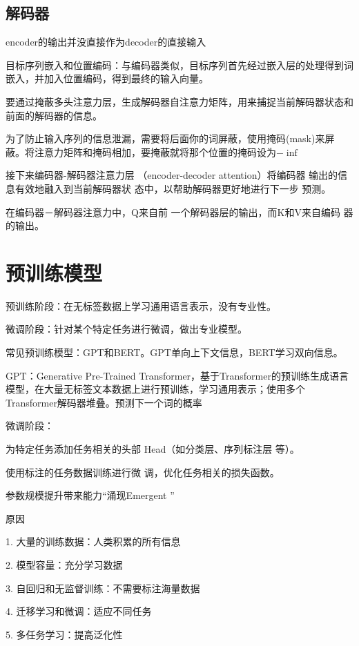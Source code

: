 \documentclass[UTF8]{ctexart}
\begin{document}
\subsection{解码器}
encoder的输出并没直接作为decoder的直接输⼊

目标序列嵌⼊和位置编码：与编码器类似，目标序列首先经过嵌⼊层的处理得到词嵌⼊，并加⼊位置编码，得到最终的输⼊向量。

要通过掩蔽多头注意力层，生成解码器自注意力矩阵，用来捕捉当前解码器状态和前面的解码器的信息。

为了防止输入序列的信息泄漏，需要将后面你的词屏蔽，使用掩码(mask)来屏蔽。将注意力矩阵和掩码相加，要掩蔽就将那个位置的掩码设为$-\inf$

接下来编码器-解码器注意⼒层
（encoder-decoder attention）将编码器
输出的信息有效地融⼊到当前解码器状
态中，以帮助解码器更好地进⾏下⼀步
预测。

在编码器－解码器注意⼒中，Q来自前
⼀个解码器层的输出，⽽K和V来自编码
器的输出。

\section{预训练模型}

预训练阶段：在无标签数据上学习通用语言表示，没有专业性。

微调阶段：针对某个特定任务进行微调，做出专业模型。

常见预训练模型：GPT和BERT。GPT单向上下文信息，BERT学习双向信息。

GPT：Generative Pre-Trained Transformer，基于Transformer的预训练生成语言模型，在大量无标签文本数据上进行预训练，学习通用表示；使用多个Transformer解码器堆叠。预测下一个词的概率

微调阶段：

为特定任务添加任务相关的头部
Head（如分类层、序列标注层
等）。

使用标注的任务数据训练进⾏微
调，优化任务相关的损失函数。

参数规模提升带来能⼒“涌现Emergent ”

原因

1. ⼤量的训练数据：⼈类积累的所有信息

2. 模型容量：充分学习数据

3. 自回归和⽆监督训练：不需要标注海量数据

4. 迁移学习和微调：适应不同任务

5. 多任务学习：提⾼泛化性
\end{document}
